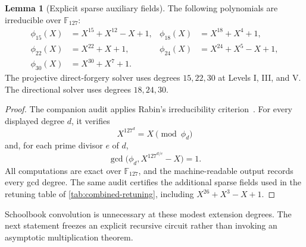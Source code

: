 \documentclass[11pt,a4paper]{article}
\theoremstyle{definition}
\newtheorem{lemma}[theorem]{Lemma}
\theoremstyle{remark}
\newcommand{\F}{\mathbb F}
\begin{document}
\begin{lemma}[Explicit sparse auxiliary fields]\label{lem:sparse-fields}
The following polynomials are irreducible over $\F_{127}$:
\begin{align*}
 \phi_{15}(X)&=X^{15}+X^{12}-X+1,
 &\phi_{18}(X)&=X^{18}+X^4+1,\\
 \phi_{22}(X)&=X^{22}+X+1,
 &\phi_{24}(X)&=X^{24}+X^5-X+1,\\
 \phi_{30}(X)&=X^{30}+X^7+1.
\end{align*}
The projective direct-forgery solver uses degrees $15,22,30$ at Levels I,
III, and V.  The directional solver uses degrees $18,24,30$.
\end{lemma}

\begin{proof}
The companion audit applies Rabin's irreducibility criterion~\cite{Rabin1980}.
For every displayed degree $d$, it verifies
\[
 X^{127^d}=X\pmod{\phi_d}
\]
and, for each prime divisor $e$ of $d$,
\[
 \gcd\bigl(\phi_d,X^{127^{d/e}}-X\bigr)=1.
\]
All computations are exact over $\F_{127}$, and the machine-readable output
records every gcd degree.  The same audit certifies the additional sparse
fields used in the retuning table of \cref{tab:combined-retuning}, including
$X^{26}+X^3-X+1$.
\end{proof}

Schoolbook convolution is unnecessary at these modest extension degrees.  The
next statement freezes an explicit recursive circuit rather than invoking an
asymptotic multiplication theorem.
\end{document}

